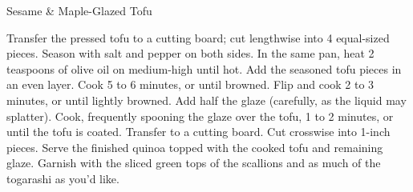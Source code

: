 \begin{recipe}[\vegan]{Sesame \& Maple-Glazed Tofu}
\begin{instructions}
        Transfer the pressed tofu to a cutting board; cut lengthwise into 4 equal-sized pieces. Season with salt and pepper on both sides. In the same pan, heat 2 teaspoons of olive oil on medium-high until hot. Add the seasoned tofu pieces in an even layer. Cook 5 to 6 minutes, or until browned. Flip and cook 2 to 3 minutes, or until lightly browned. Add half the glaze (carefully, as the liquid may splatter). Cook, frequently spooning the glaze over the tofu, 1 to 2 minutes, or until the tofu is coated. Transfer to a cutting board. Cut crosswise into 1-inch pieces. Serve the finished quinoa topped with the cooked tofu and remaining glaze. Garnish with the sliced green tops of the scallions and as much of the togarashi as you’d like.
    \end{instructions}
\end{recipe}
